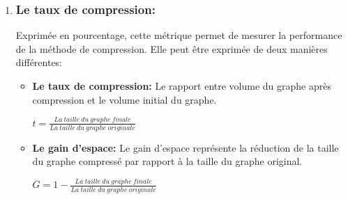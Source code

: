 \begin{enumerate}[label=\alph*)]
				\item 	\subsubsection{Le taux de compression:}
				Exprimée en pourcentage, cette métrique permet de mesurer la performance de la méthode de compression. Elle peut être exprimée de deux manières différentes:
				
				\begin{itemize}
					\item \textbf{Le taux de compression:} Le rapport entre volume du graphe après compression et le volume initial du graphe.
					\begin{center}
				$
				t = \frac{La\ taille\ du\ graphe\ finale}{La\ taille\ du\ graphe\ originale }
				$
				\end{center}
					\item \textbf{Le gain d'espace: }Le gain d'espace représente la réduction de la taille du graphe compressé par rapport à la taille du graphe original.
					
					\begin{center}
				$
				G = 1 - \frac{La\ taille\ du\ graphe\ finale}{La\ taille\ du\ graphe\ originale }
				$
				\end{center}
					
					
				\end{itemize}
				\end{enumerate}
				
				
				
				
				
				
				
				
				
			